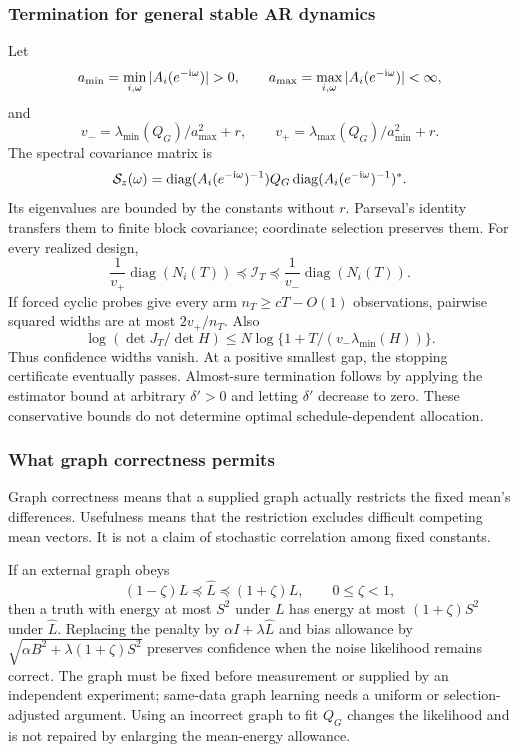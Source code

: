 \subsubsection{Termination for general stable AR dynamics}
Let
\[
a_{\min}=\min_{i,\omega}|A_i(e^{-{\rm i}\omega})|>0,\qquad
a_{\max}=\max_{i,\omega}|A_i(e^{-{\rm i}\omega})|<\infty,
\]
and
\begin{equation}
v_-=\lambda_{\min}(Q_G)/a_{\max}^2+r,\qquad
v_+=\lambda_{\max}(Q_G)/a_{\min}^2+r.
\end{equation}
The spectral covariance matrix is
\begin{equation}
\mathcal S_z(\omega)=
\operatorname{diag}(A_i(e^{-{\rm i}\omega})^{-1})Q_G
\operatorname{diag}(A_i(e^{-{\rm i}\omega})^{-1})^*.
\label{spatiotemporal_bandits:eq:spectrum}
\end{equation}
Its eigenvalues are bounded by the constants without $r$. Parseval's identity transfers them to finite block covariance; coordinate selection preserves them. For every realized design,
\begin{equation}
\boxed{\frac1{v_+}\operatorname{diag}(N_i(T))
\preceq\mathcal I_T\preceq\frac1{v_-}\operatorname{diag}(N_i(T)).}
\label{spatiotemporal_bandits:eq:information-bounds}
\end{equation}
If forced cyclic probes give every arm $n_T\ge cT-O(1)$ observations, pairwise squared widths are at most $2v_+/n_T$. Also
\[
\log(\det J_T/\det H)\le N\log\{1+T/(v_-\lambda_{\min}(H))\}.
\]
Thus confidence widths vanish. At a positive smallest gap, the stopping certificate eventually passes. Almost-sure termination follows by applying the estimator bound at arbitrary $\delta'>0$ and letting $\delta'$ decrease to zero. These conservative bounds do not determine optimal schedule-dependent allocation.

\subsubsection{What graph correctness permits}
Graph correctness means that a supplied graph actually restricts the fixed mean's differences. Usefulness means that the restriction excludes difficult competing mean vectors. It is not a claim of stochastic correlation among fixed constants.

If an external graph obeys
\[
(1-\zeta)L\preceq\widehat L\preceq(1+\zeta)L,\qquad0\le\zeta<1,
\]
then a truth with energy at most $S^2$ under $L$ has energy at most $(1+\zeta)S^2$ under $\widehat L$. Replacing the penalty by $\alpha I+\lambda\widehat L$ and bias allowance by $\sqrt{\alpha B^2+\lambda(1+\zeta)S^2}$ preserves confidence when the noise likelihood remains correct. The graph must be fixed before measurement or supplied by an independent experiment; same-data graph learning needs a uniform or selection-adjusted argument. Using an incorrect graph to fit $Q_G$ changes the likelihood and is not repaired by enlarging the mean-energy allowance.

